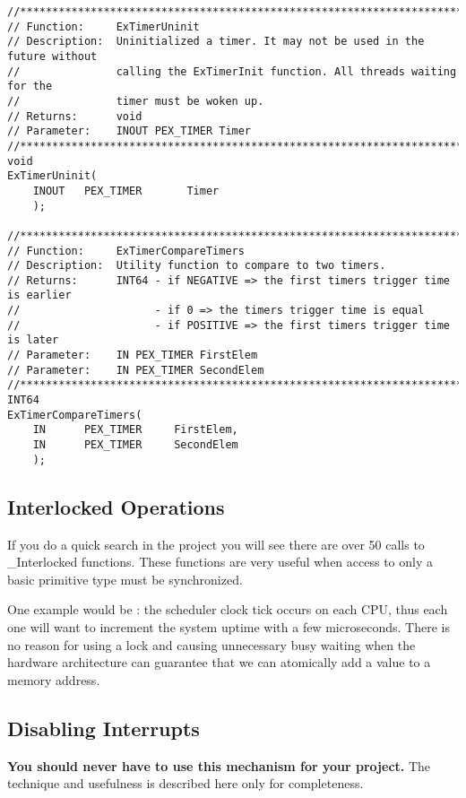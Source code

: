 \begin{appendices}
\begin{lstlisting}[caption={Timer functions},label={lst:TimerFunc}]
//******************************************************************************
// Function:     ExTimerUninit
// Description:  Uninitialized a timer. It may not be used in the future without
//               calling the ExTimerInit function. All threads waiting for the
//               timer must be woken up.
// Returns:      void
// Parameter:    INOUT PEX_TIMER Timer
//******************************************************************************
void
ExTimerUninit(
    INOUT   PEX_TIMER       Timer
    );

//******************************************************************************
// Function:     ExTimerCompareTimers
// Description:  Utility function to compare to two timers.
// Returns:      INT64 - if NEGATIVE => the first timers trigger time is earlier
//                     - if 0 => the timers trigger time is equal
//                     - if POSITIVE => the first timers trigger time is later
// Parameter:    IN PEX_TIMER FirstElem
// Parameter:    IN PEX_TIMER SecondElem
//******************************************************************************
INT64
ExTimerCompareTimers(
    IN      PEX_TIMER     FirstElem,
    IN      PEX_TIMER     SecondElem
    );
\end{lstlisting}

\subsection{Interlocked Operations}

If you do a quick search in the project you will see there are over 50 calls to \_Interlocked
functions. These functions are very useful when access to only a basic primitive type must be
synchronized.

One example would be : the scheduler clock tick occurs on each CPU,
thus each one will want to increment the system uptime with a few microseconds. There is no reason
for using a lock and causing unnecessary busy waiting when the hardware architecture can guarantee
that we can atomically add a value to a memory address.

\subsection{Disabling Interrupts}
\label{sect:DisablingInt}

\textbf{You should never have to use this mechanism for your project.} The technique and usefulness
is described here only for completeness.


\end{appendices}
